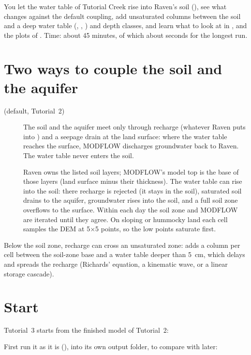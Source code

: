 
\begin{goal}
You let the water table of Tutorial Creek rise into Raven's soil (), see what changes against the
default  coupling, add unsaturated columns between the soil and a deep water table
(, , ) and depth classes, and learn what to look at in
,  and the plots of . Time: about 45 minutes, of which
about  seconds for the longest run.
\end{goal}

\section{Two ways to couple the soil and the aquifer}
\begin{description}
\item[ (default, Tutorial~2)] The soil and the aquifer meet only through recharge (whatever Raven puts into
  ) and a seepage drain at the land surface: where the water table reaches the surface, MODFLOW discharges
  groundwater back to Raven. The water table never enters the soil.
\item[] Raven owns the listed soil layers; MODFLOW's model top is the base of those layers (land surface minus
  their thickness). The water table can rise into the soil: there recharge is rejected (it stays in the soil), saturated
  soil drains to the aquifer, groundwater rises into the soil, and a full soil zone overflows to the surface. Within each
  day the soil zone and MODFLOW are iterated until they agree. On sloping or hummocky land each cell samples the DEM at
  5$\times$5 points, so the low points saturate first.
\end{description}
Below the soil zone, recharge can cross an unsaturated zone:  adds a column per cell between the
soil-zone base and a water table deeper than 5~cm, which delays and spreads the recharge (Richards' equation, a kinematic
wave, or a linear storage cascade).

\section{Start}
Tutorial~3 starts from the finished model of Tutorial~2:
First run it as it is (), into its own output folder, to compare with later:


